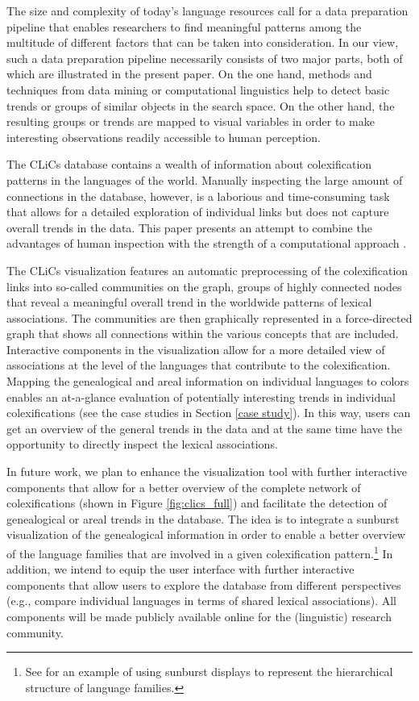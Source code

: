 \documentclass[10pt, a4paper]{article}
\begin{document}
The size and complexity of today's language resources call for a data preparation pipeline that enables researchers to find meaningful patterns among the multitude of different factors that can be taken into consideration. In our view, such a data preparation pipeline necessarily consists of two major parts, both of which are illustrated in the present paper. On the one hand, methods and techniques from data mining or computational linguistics help to detect basic trends or groups of similar objects in the search space. On the other hand, the resulting groups or trends are mapped to visual variables in order to make interesting observations readily accessible to human perception. 

The CLiCs database contains a wealth of information about colexification patterns in the languages of the world. Manually inspecting the large amount of connections in the database, however, is a laborious and time-consuming task that allows for a detailed exploration of individual links but does not capture overall trends in the data. This paper presents an attempt to combine the advantages of human inspection with the strength of a computational approach \cite{Keim2008}. 

The CLiCs visualization features an automatic preprocessing of the colexification links into so-called communities on the graph, groups of highly connected nodes that reveal a meaningful overall trend in the worldwide patterns of lexical associations. The communities are then graphically represented in a force-directed graph that shows all connections within the various concepts that are included. Interactive components in the visualization allow for a more detailed view of associations at the level of the languages that contribute to the colexification. 
Mapping the genealogical and areal information on individual languages to colors enables an at-a-glance evaluation of potentially interesting trends in individual colexifications (see the case studies in Section \ref{case study}). 
In this way, users can get an overview of the general trends in the data and at the same time have the opportunity to directly inspect the lexical associations. 

In future work, we plan to enhance the visualization tool with further interactive components that allow for a better overview of the complete network of colexifications (shown in Figure \ref{fig:clics_full}) and facilitate the detection of genealogical or areal trends in the database. The idea is to integrate a sunburst visualization \cite{Sunburst}  of the genealogical information in order to enable a better overview of the language families that are involved in a given colexification pattern.\footnote{See  for an example of using sunburst displays to represent the hierarchical structure of language families.} In addition, we intend to equip the user interface with further interactive components that allow users to explore the database from different perspectives (e.g., compare individual languages in terms of shared lexical associations). All components will be made publicly available online for the (linguistic) research community. 
\end{document}
